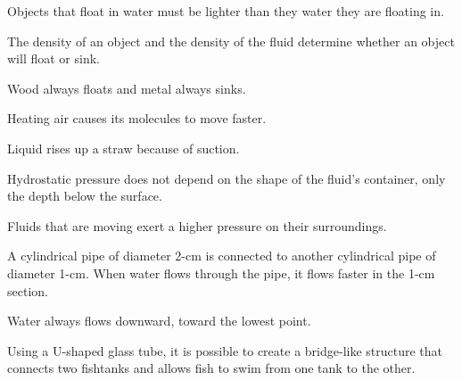 \documentclass[10pt]{examdesign}
\begin{document}
\begin{truefalse}[title={True or False},
	rearrange=no]
	\begin{question}
		 Objects that float in water must be lighter than they water they are floating in. 
	\end{question}

	\begin{question}
		 The density of an object and the density of the fluid determine whether an object will float or sink.
	\end{question}

	\begin{question}
	 Wood always floats and metal always sinks.
\end{question}
	 
	\begin{question}
		 Heating air causes its molecules to move faster.
	\end{question}
	\begin{question}
	 Liquid rises up a straw because of suction.
\end{question}

\begin{question}
	 Hydrostatic pressure does not depend on the shape of the fluid's container, only the depth below the surface. 
\end{question}

\begin{question}
	 Fluids that are moving exert a higher pressure on their surroundings.
\end{question}

\begin{question}
	 A cylindrical pipe of diameter 2-cm is connected to another cylindrical pipe of diameter 1-cm.  When water flows through the pipe, it flows faster in the 1-cm section. 
	
\end{question}


\begin{question}
	 Water always flows downward, toward the lowest point.
\end{question}

\begin{question}
	  Using a U-shaped glass tube, it is possible to create a bridge-like structure that connects two fishtanks and allows fish to swim from one tank to the other.  
\end{question}


\end{truefalse}
\end{document}
